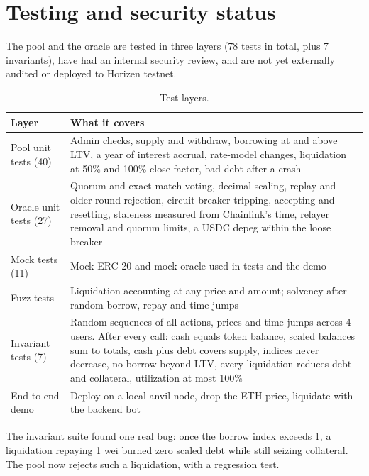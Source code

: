 \documentclass[11pt,a4paper]{article}
\begin{document}
\section{Testing and security status}

The pool and the oracle are tested in three layers (78 tests in total, plus 7 invariants), have had an internal
security review, and are not yet externally audited or deployed to Horizen testnet.

\begin{table}[h]
\centering
\caption{Test layers.}
\begin{tabularx}{\textwidth}{@{}p{3.2cm}L@{}}
\toprule
Layer & What it covers \\
\midrule
Pool unit tests (40) & Admin checks, supply and withdraw, borrowing at and above LTV, a year of interest
  accrual, rate-model changes, liquidation at 50\% and 100\% close factor, bad debt after a crash \\ \addlinespace
Oracle unit tests (27) & Quorum and exact-match voting, decimal scaling, replay and older-round rejection,
  circuit breaker tripping, accepting and resetting, staleness measured from Chainlink's time, relayer
  removal and quorum limits, a USDC depeg within the loose breaker \\ \addlinespace
Mock tests (11) & Mock ERC-20 and mock oracle used in tests and the demo \\ \addlinespace
Fuzz tests & Liquidation accounting at any price and amount; solvency after random borrow, repay and time
  jumps \\ \addlinespace
Invariant tests (7) & Random sequences of all actions, prices and time jumps across 4 users. After every call:
  cash equals token balance, scaled balances sum to totals, cash plus debt covers supply, indices never
  decrease, no borrow beyond LTV, every liquidation reduces debt and collateral, utilization at most 100\% \\ \addlinespace
End-to-end demo & Deploy on a local anvil node, drop the ETH price, liquidate with the backend bot \\
\bottomrule
\end{tabularx}
\end{table}

The invariant suite found one real bug: once the borrow index exceeds 1, a liquidation repaying 1 wei burned
zero scaled debt while still seizing collateral. The pool now rejects such a liquidation, with a regression
test.
\end{document}
